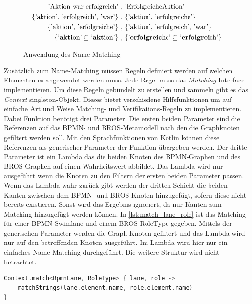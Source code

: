 \begin{figure}
    \centering
    \begin{align}
        \text{'Aktion war erfolgreich'}\ ,&\ \text{'ErfolgreicheAktion'} \label{eq:name_matching_1}\\
        \text{\{'aktion', 'erfolgreich', 'war'\}}\ ,&\ \text{\{'aktion', 'erfolgreiche'\}} \label{eq:name_matching_2}\\
        \text{\{'aktion', 'erfolgreiche'\}}\ ,&\ \text{\{'aktion', 'erfolgreich', 'war'\}} \label{eq:name_matching_3}\\
        \text{\{'\textbf{akti}on'} \subseteq \text{'\textbf{akti}on'\}}\ ,&\ \text{\{'\textbf{erfolgreic}he'} \subseteq \text{'\textbf{erfolgrei}ch'\}} \label{eq:name_matching_4}
    \end{align}
    \caption{Anwendung des Name-Matching}
    \label{eq:name_matching}
\end{figure}

Zusätzlich zum Name-Matching müssen Regeln definiert werden auf welchen Elementen es angewendet werden muss.
Jede Regel muss das \emph{Matching} Interface implementieren.
Um diese Regeln gebündelt zu erstellen und sammeln gibt es das \emph{Context} singleton-Objekt.
Dieses bietet verschiedene Hilfsfunktionen um auf einfache Art und Weise Matching- und Verifikations-Regeln zu implementieren.
Dabei Funktion benötigt drei Parameter.
Die ersten beiden Parameter sind die Referenzen auf das BPMN- und BROS-Metamodell nach den die Graphknoten gefiltert werden soll.
Mit den Sprachfunktionen von Kotlin können diese Referenzen als generischer Parameter der Funktion übergeben werden.
Der dritte Parameter ist ein Lambda das die beiden Knoten des BPMN-Graphen und des BROS-Graphen auf einen Wahrheitswert abbildet.
Das Lambda wird nur ausgeführt wenn die Knoten zu den Filtern der ersten beiden Parameter passen.
Wenn das Lambda wahr zurück gibt werden der dritten Schicht die beiden Kanten zwischen dem BPMN- und BROS-Knoten hinzugefügt, sofern diese nicht bereits existieren.
Sonst wird das Ergebnis ignoriert, da nur Kanten zum Matching hinzugefügt werden können.
In \cref{lst:match_lane_role} ist das Matching für einer BPMN-Swimlane und einem BROS-RoleType gegeben.
Mittels der generischen Parameter werden die Graph-Knoten gefiltert und das Lambda wird nur auf den betreffenden Knoten ausgeführt. 
Im Lambda wird hier nur ein einfaches Name-Matching durchgeführt.
Die weitere Struktur wird nicht betrachtet.

\begin{lstlisting}[language=Kotlin, caption=Matching Regel von einer BPMN-SwimLane und einem BROS-RoleType, label=lst:match_lane_role]
Context.match<BpmnLane, RoleType> { lane, role ->
    matchStrings(lane.element.name, role.element.name)
}
\end{lstlisting}

